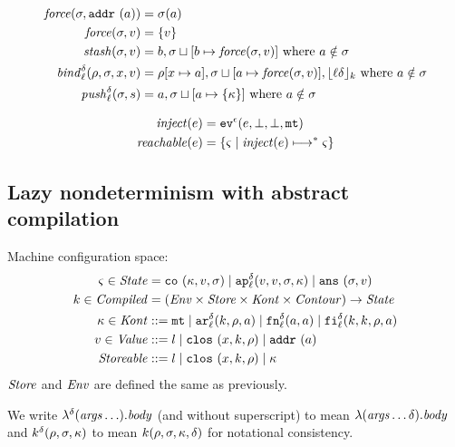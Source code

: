 \documentclass{llncs}
\newcommand{\inject}{\mathit{inject}}
\newcommand{\setof}[1]{\{ #1 \}}
\newcommand{\alt}{\mid}
\begin{document}
\begin{align*}
\mathit{force}(\sigma,{\tt addr{\ }}({a})) &= \sigma(a) \\
\mathit{force}(\sigma,v) &= \{ v \} \\
\mathit{stash}(\sigma,v) &= b, \sigma\sqcup[b \mapsto \mathit{force}(\sigma, v)]
\mbox{ where }a \notin\sigma \\
\mathit{bind}_{\ell}^{\delta}(\rho,\sigma,x,v) &= \rho[x\mapsto a],\sigma\sqcup[a\mapsto\mathit{force}(\sigma,v)],\lfloor {\ell}{\delta} \rfloor_k
\mbox{ where }a \notin\sigma \\
\mathit{push}_{\ell}^{\delta}(\sigma,s) &= a,\sigma\sqcup[a\mapsto\{\kappa\}]
\mbox{ where }a \notin\sigma
\end{align*}

\begin{align*}
\inject(\mexp) &= \ev[^\mtcntr]{\mexp,\bot,\bot,\kmt} \\
\reachable{\mexp} &= \setof{\mstate \mid \inject(\mexp) \machstep^* \mstate}
\end{align*}

\subsection{Lazy nondeterminism with abstract compilation}

Machine configuration space:
\begin{align*}
\mstate \in \State &= \co{\mkont, \mval, \msto} \alt
                     \ap[_\mlab^\mcntr]{\mval,\mval,\msto,\mkont} \alt
                     \ans{\msto, \mval}\\
\mcomp \in \Compiled &= (\Env \times \Store \times \Kont \times \Counter) \to \State \\
\mkont \in \Kont &::= \kmt \alt
                      \kar[_\mlab^\mcntr]{\mcomp, \menv, \maddr} \alt
                      \kfn[_\mlab^\mcntr]{\maddr, \maddr} \alt
                      \kif[_\mlab^\mcntr]{\mcomp, \mcomp, \menv, \maddr} \\
\mval \in \Value &::= \mlit \alt
                      \clos{\mvar,\mcomp,\menv} \alt
                      \saddr\maddr \\
\Storeable &::= \mlit \alt
                \clos{\mvar,\mcomp,\menv} \alt
                \mkont \\
\end{align*}
$\mathit{Store}$ and $\mathit{Env}$ are defined the same as previously.

We write $\lambda^{\delta}(\mathit{args}\ldots). \mathit{body}$ (and without superscript) to mean
$\lambda(\mathit{args}\ldots {\delta}). \mathit{body}$ and
$k^{\delta}(\rho, \sigma, \kappa)$ to mean $k(\rho, \sigma,
\kappa, {\delta})$ for notational consistency.
\end{document}
